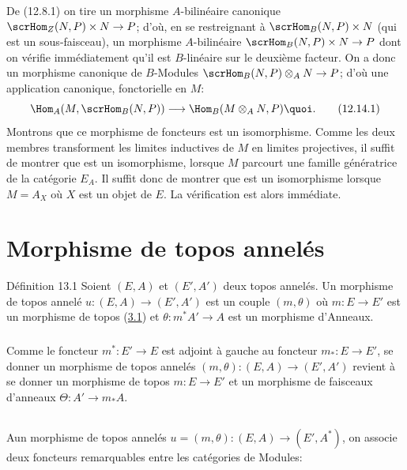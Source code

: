 \documentclass[10pt]{../fichiers-configuration-latex/smfart}
\begin{document}
\noindent De (12.8.1) on tire un morphisme $A$-bilinéaire
canonique $\scrHom_Z(N,P)\times N\rightarrow P$; d'où, en se
restreignant à $\scrHom_B(N,P)\times N$ (qui est un sous-faisceau),
un morphisme $A$-bilinéaire $\scrHom_B(N,P)\times N\rightarrow P$
dont on vérifie immédiatement qu'il est $B$-linéaire sur
le deuxième
facteur. On a donc un morphisme canonique de $B$-Modules
$\scrHom_B(N,P)\otimes_A N\rightarrow P$; d'où une application
canonique, fonctorielle en $M$:
\begin{equation*}
\Hom_A(M,\scrHom_B(N,P))\longrightarrow \Hom_B (M\otimes_A
N,P){\quoi}.\tag{12.14.1}
\end{equation*}
Montrons que ce morphisme de foncteurs est un isomorphisme. Comme
les deux membres transforment les limites inductives de $M$ en
limites projectives, il suffit de montrer que  est un
isomorphisme, lorsque $M$ parcourt une famille génératrice de la
catégorie $E_A$. Il suffit donc de montrer que  est
un isomorphisme lorsque $M=A_X$ où $X$ est un objet de $E$. La
vérification est alors immédiate.


\section{Morphisme de topos annelés}

\begin{enonce*}{Définition 13.1}
Soient $(E,A)$ et $(E',A')$ deux topos annelés. Un morphisme de
topos annelé $u:(E,A)\rightarrow (E',A')$ est un couple $(m,\theta)$
où $m:E\rightarrow E'$ est un morphisme de topos {\rm
(\hyperref[IV.def3.1]{3.1})} et $\theta:m^{\ast}A'\rightarrow A$ est un
morphisme d'Anneaux.
\end{enonce*}

\setcounter{subsection}{1}
\subsubsection{}
Comme le foncteur $m^{\ast}:E'\rightarrow E$ est adjoint à gauche au
foncteur $m_{\ast}:E\rightarrow E'$, se donner un morphisme de topos
annelés $(m,\theta):(E,A)\rightarrow (E',A')$ revient à se donner un
morphisme de topos $m:E\rightarrow E'$ et un morphisme de faisceaux
d'anneaux $\Theta:A'\rightarrow m_{\ast}A$.

\subsection{}
A\pageoriginale un morphisme de topos annelés
$u=(m,\theta):(E,A)\rightarrow (E',A^{\ast})$, on associe deux
foncteurs remarquables entre les catégories de Modules:
\end{document}
